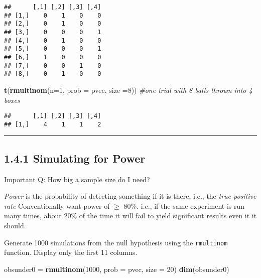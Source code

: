 \documentclass[]{article}
\newenvironment{Shaded}{\begin{snugshade}}{\end{snugshade}}
\newcommand{\KeywordTok}[1]{\textcolor[rgb]{0.13,0.29,0.53}{\textbf{#1}}}
\newcommand{\DataTypeTok}[1]{\textcolor[rgb]{0.13,0.29,0.53}{#1}}
\newcommand{\DecValTok}[1]{\textcolor[rgb]{0.00,0.00,0.81}{#1}}
\newcommand{\StringTok}[1]{\textcolor[rgb]{0.31,0.60,0.02}{#1}}
\newcommand{\CommentTok}[1]{\textcolor[rgb]{0.56,0.35,0.01}{\textit{#1}}}
\newcommand{\NormalTok}[1]{#1}
\let\oldrule=\rule
\renewcommand{\rule}[1]{\oldrule{\linewidth}}
\begin{document}
\begin{verbatim}
##      [,1] [,2] [,3] [,4]
## [1,]    0    1    0    0
## [2,]    0    1    0    0
## [3,]    0    0    0    1
## [4,]    0    1    0    0
## [5,]    0    0    0    1
## [6,]    1    0    0    0
## [7,]    0    0    1    0
## [8,]    0    1    0    0
\end{verbatim}

\begin{Shaded}
\begin{Highlighting}[]
\KeywordTok{t}\NormalTok{(}\KeywordTok{rmultinom}\NormalTok{(}\DataTypeTok{n=}\DecValTok{1}\NormalTok{, }\DataTypeTok{prob =}\NormalTok{ pvec, }\DataTypeTok{size =}\DecValTok{8}\NormalTok{)) }\CommentTok{#one trial with 8 balls thrown into 4 boxes}
\end{Highlighting}
\end{Shaded}

\begin{verbatim}
##      [,1] [,2] [,3] [,4]
## [1,]    4    1    1    2
\end{verbatim}

\begin{center}\rule{0.5\linewidth}{\linethickness}\end{center}

\subsection{1.4.1 Simulating for Power}\label{simulating-for-power}

Important Q: How big a sample size do I need?

\emph{Power} is the probability of detecting something if it is there,
i.e., the \emph{true positive rate} Conventionally want power of
\(\geq\) 80\%. i.e., if the same experiment is run many times, about
20\% of the time it will fail to yield significant results even it it
should.

Generate 1000 simulations from the null hypothesis using the
\texttt{rmultinom} function. Display only the first 11 columns.

\begin{Shaded}
\begin{Highlighting}[]
\NormalTok{obsunder0 =}\StringTok{ }\KeywordTok{rmultinom}\NormalTok{(}\DecValTok{1000}\NormalTok{, }\DataTypeTok{prob =}\NormalTok{ pvec, }\DataTypeTok{size =} \DecValTok{20}\NormalTok{)}
\KeywordTok{dim}\NormalTok{(obsunder0)}
\end{Highlighting}
\end{Shaded}
\end{document}
